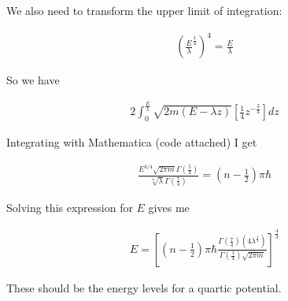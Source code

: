 \documentclass[paper=a4, fontsize=11pt]{scrartcl} %
\numberwithin{equation}{section} %
\numberwithin{figure}{section} %
\numberwithin{table}{section} %
\begin{document}
We also need to transform the upper limit of integration:

\begin{align}
(\frac{E}{\lambda}^{\frac{1}{4}})^{4} = \frac{E}{\lambda}
\end{align}

So we have

\begin{align}
2 \int_{0}^{\frac{E}{\lambda}} \sqrt{2m(E - \lambda z)}\left[\frac{1}{4}z^{-\frac{3}{4}}\right] dz
\end{align}


Integrating with Mathematica (code attached) I get

\begin{align}
\frac{E^{3/4} \sqrt{2 \pi m} \Gamma \left(\frac{5}{4}\right)}{\sqrt[4]{\lambda } \Gamma \left(\frac{7}{4}\right)}= \left(n - \frac{1}{2}\right)\pi \hbar
\end{align}

Solving this expression for $E$ gives me

\begin{align}
E = \left[\left(n - \frac{1}{2}\right)\pi\hbar \frac{\Gamma(\frac{7}{4})(4 \lambda^{\frac{1}{4}})}{\Gamma(\frac{1}{4})\sqrt{2 \pi m}} \right]^{\frac{4}{3}}
\end{align}

These should be the energy levels for a quartic potential.



\end{document}
